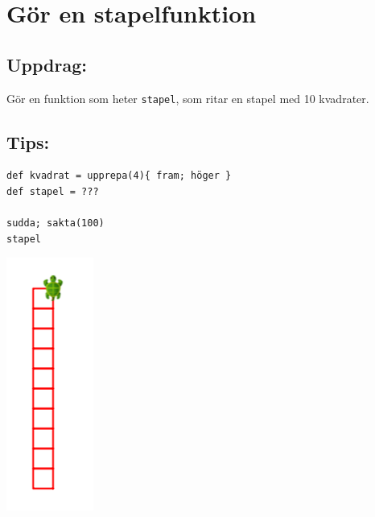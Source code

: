 \chapter{Gör en stapelfunktion}
\begin{multicols}{2}
\section*{\color{BrickRed}Uppdrag:}
Gör en funktion som heter \lstinline{stapel}, som ritar en stapel med 10 kvadrater.
\section*{\color{OliveGreen}Tips:}

\begin{lstlisting}[numbers=none]
def kvadrat = upprepa(4){ fram; höger }  
def stapel = ???

sudda; sakta(100)
stapel
\end{lstlisting}
        

\columnbreak

\begin{center}
\includegraphics{../img/square-column.png}
\end{center}

\end{multicols}

